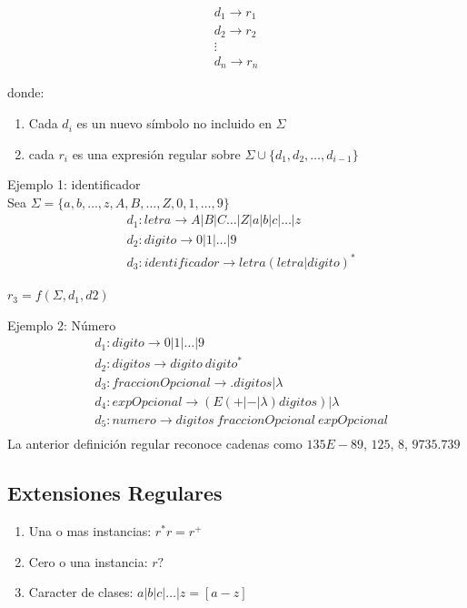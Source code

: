 \begin{align*}
    d_1\rightarrow r_1\\
    d_2\rightarrow r_2\\
    \vdots\\
    d_n \rightarrow r_n
\end{align*}

donde:

\begin{enumerate}
    \item Cada $d_i$ es un nuevo símbolo no incluido en $\Sigma$
    \item cada $r_i$ es una expresión regular sobre $\Sigma \cup \{d_1, d_2, \dots, d_{i-1}\}$
\end{enumerate}

Ejemplo 1: identificador\\
Sea $\Sigma=\{a, b, \dots, z, A, B, \dots, Z, 0, 1, \dots, 9\}$
\begin{align*}
    &d_1:letra\rightarrow A|B|C\dots|Z|a|b|c|\dots|z\\
    &d_2:digito\rightarrow 0|1|\dots|9\\
    &d_3:identificador\rightarrow letra(letra|digito)^*
\end{align*}

$r_3=f(\Sigma, d_1, d2)$

Ejemplo 2: Número\\
\begin{align*}
    &d_1:digito\rightarrow 0|1|\dots|9\\
    &d_2:digitos\rightarrow digito\ digito^*\\
    &d_3:fraccionOpcional\rightarrow .digitos|\lambda\\
    &d_4:expOpcional\rightarrow (E(+|-|\lambda)digitos)|\lambda\\
    &d_5:numero\rightarrow digitos\ fraccionOpcional\ expOpcional\\
\end{align*}
La anterior definición regular reconoce cadenas como $135E-89$, $125$, $8$, $9735.739$

\subsection{Extensiones Regulares}

\begin{enumerate}
    \item Una o mas instancias: $r^*r = r^+$
    \item Cero o una instancia: $r?$
    \item Caracter de clases: $a|b|c|\dots|z = [a-z]$
\end{enumerate}

